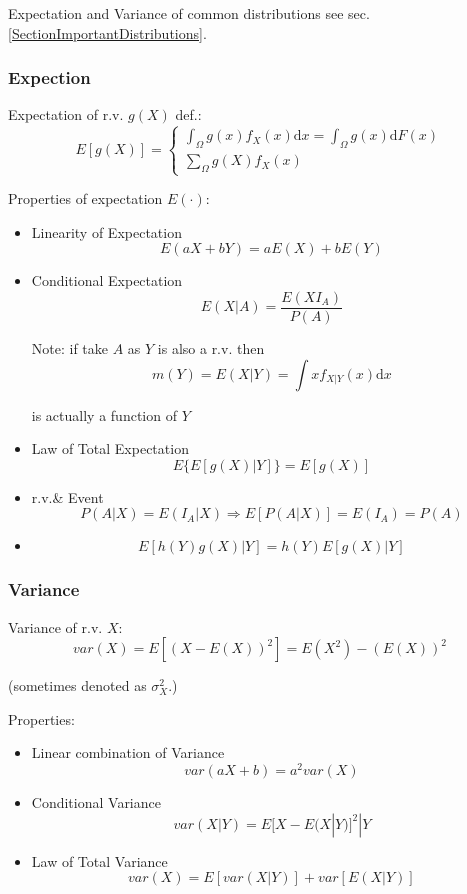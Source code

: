 \documentclass[11pt,a4paper]{ctexart}
\numberwithin{equation}{section}%
\begin{document}
    Expectation and Variance of common distributions see sec.\ref{SectionImportantDistributions}.

\subsubsection{Expection}
    Expectation of r.v. $g(X)$ def.:
    \[
    E[g(X)]=\begin{cases}
        {\displaystyle\int_\Omega g(x) f_X(x)\mathrm{d}x=\int_\Omega g(x)\mathrm{d}F(x)}\\
        {\displaystyle\sum_{\Omega}g(X)f_X(x)}
    \end{cases}
\]

    Properties of expectation $E(\cdot)$:
\begin{itemize}
    \item Linearity of Expectation\[
        E(aX+bY)=aE(X)+bE(Y)
    \]
    \item Conditional Expectation\[
        E(X|A)=\frac{E(XI_A)}{P(A)}
    \]
    
    Note: if take $A$ as $Y$ is also a r.v. then 
    \[m(Y)=E(X|Y)=\int xf_{X|Y}(x)\mathrm{d}x\]

    is actually a function of $Y$

    \item Law of Total Expectation\[
    E\{E[g(X)|Y]\}=E[g(X)]
    \]
    \item r.v.\& Event
    \[
        P(A|X)=E(I_A|X)\Rightarrow E[P(A|X)]=E(I_A)=P(A)
    \]
    \item \[
        E[h(Y)g(X)|Y]=h(Y)E[g(X)|Y]
    \]
\end{itemize}


\subsubsection{Variance}
    Variance of r.v. $X$: 
    \[
        var(X)=E[(X-E(X))^2]=E(X^2)-(E(X))^2
    \]

    (sometimes denoted as $\sigma^2_X$.)

    Properties:
\begin{itemize} 
    \item Linear combination of Variance\[
        var(aX+b)=a^2var(X)
    \]
    \item Conditional Variance
    \[
        var(X|Y)=E{[X-E(X|Y)]^2|Y}
    \]
    \item Law of Total Variance\[
        var(X)=E[var(X|Y)]+var[E(X|Y)]
    \]
\end{itemize}
\end{document}
